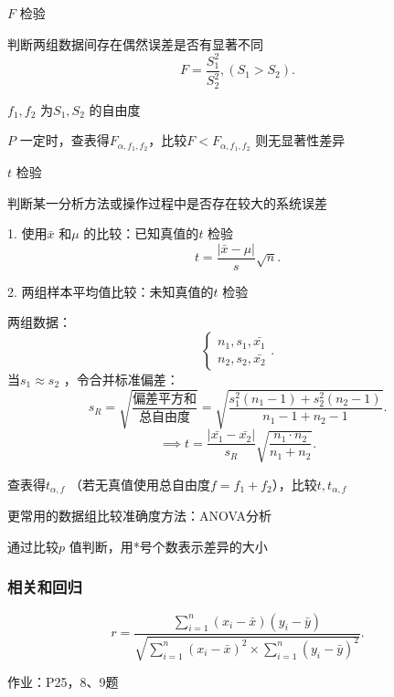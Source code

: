 \begin{notation}
    $F$ 检验

    判断两组数据间存在偶然误差是否有显著不同
    \[
        F=\frac{S_1^2}{S_2^2},\left( S_1>S_2 \right) 
    .\]

    $f_1,f_2$ 为$S_1,S_2$ 的自由度

    $P$ 一定时，查表得$F_{\alpha,f_1,f_2}$，比较$F<F_{\alpha,f_1,f_2}$ 则无显著性差异
\end{notation}

\begin{notation}
    $t$ 检验

    判断某一分析方法或操作过程中是否存在较大的系统误差

    1. 使用$\bar{x}$ 和$\mu$ 的比较：已知真值的$t$ 检验
    \[
        t=\frac{\left| \bar{x}-\mu \right| }{s}\sqrt{n} 
    .\] 
    
    2. 两组样本平均值比较：未知真值的$t$ 检验

    两组数据：
    \[
        \begin{cases}
            n_1,s_1,\bar{x_1}\\
            n_2,s_2,\bar{x_2}
        \end{cases}
    .\] 
    当$s_1\approx s_2$ ，令合并标准偏差：
    \[
        s_{R}=\sqrt{\frac{\text{偏差平方和}}{\text{总自由度}}} =\sqrt{\frac{s_1^2\left( n_1-1 \right) +s_2^2\left( n_2-1 \right) }{n_1-1+n_2-1}}  
    .\] 
    \[
        \implies t=\frac{\left| \bar{x_1}-\bar{x_2} \right| }{s_{R}}\sqrt{\frac{n_1\cdot n_2}{n_1+n_2}} 
    .\] 

    查表得$t_{\alpha,f}$ （若无真值使用总自由度$f=f_1+f_2$），比较$t,t_{\alpha,f}$
\end{notation}

\begin{notation}
    更常用的数据组比较准确度方法：ANOVA分析

    通过比较$p$ 值判断，用*号个数表示差异的大小
\end{notation}

\subsubsection{相关和回归}%
\label{subsub:相关和回归}
\[
    r = \frac{{\sum_{i=1}^{n}} \left( x_{i}-\bar{x} \right) \left( y_{i}-\bar{y} \right) }{\sqrt{{\sum_{i=1}^{n}} \left( x_{i}-\bar{x} \right) ^2\times {\sum_{i=1}^{n}} \left( y_{i}-\bar{y} \right)^2 } }
.\] 

作业：P25，8、9题

